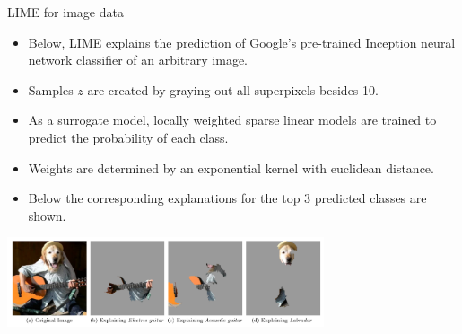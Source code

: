 \documentclass[aspectratio=169]{../latex_main/tntbeamer}  %
\begin{document}
\begin{frame}[c]{LIME for image data }
	\begin{itemize}
		\item Below, LIME explains the prediction of Google's pre-trained Inception neural network classifier of an arbitrary image. 
		\item Samples $z$ are created by graying out all superpixels besides 10. 
		\item As a surrogate model, locally weighted sparse linear models are trained to predict the probability of each class. 
		\item Weights are determined by an exponential kernel with euclidean distance.
		\item Below the corresponding explanations for the top 3 predicted classes are shown.   
	\end{itemize}
	\begin{center}
		\includegraphics[width=0.7\textwidth]{figure/lime-images}
	\end{center}
\end{frame}
\end{document}
